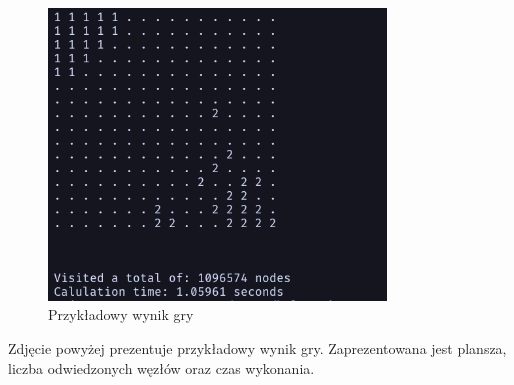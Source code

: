 \documentclass[a4paper, 12pt]{article}
\begin{document}
\begin{figure}[H]
    \centering
    \includegraphics[width=0.8\textwidth]{images/result.png} 
    \caption{Przykładowy wynik gry}
\end{figure}
Zdjęcie powyżej prezentuje przykładowy wynik gry. 
Zaprezentowana jest plansza, liczba odwiedzonych 
węzłów oraz czas wykonania. 
\end{document}
